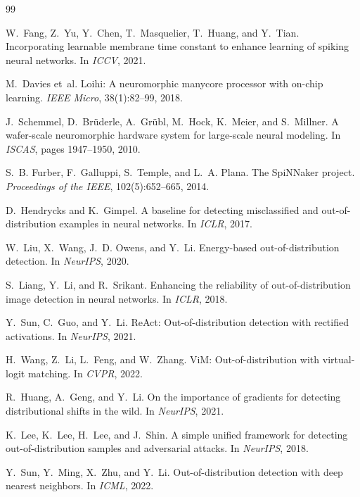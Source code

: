 \ifdefined\theoryhardwareEMBED\else
\begin{thebibliography}{99}

W.~Fang, Z.~Yu, Y.~Chen, T.~Masquelier, T.~Huang, and Y.~Tian.
\newblock Incorporating learnable membrane time constant to enhance learning of
  spiking neural networks.
\newblock In \emph{ICCV}, 2021.

M.~Davies et~al.
\newblock Loihi: A neuromorphic manycore processor with on-chip learning.
\newblock \emph{IEEE Micro}, 38(1):82--99, 2018.

J.~Schemmel, D.~Br\"uderle, A.~Gr\"ubl, M.~Hock, K.~Meier, and S.~Millner.
\newblock A wafer-scale neuromorphic hardware system for large-scale neural
  modeling.
\newblock In \emph{ISCAS}, pages 1947--1950, 2010.

S.~B. Furber, F.~Galluppi, S.~Temple, and L.~A. Plana.
\newblock The SpiNNaker project.
\newblock \emph{Proceedings of the IEEE}, 102(5):652--665, 2014.

D.~Hendrycks and K.~Gimpel.
\newblock A baseline for detecting misclassified and out-of-distribution
  examples in neural networks.
\newblock In \emph{ICLR}, 2017.

W.~Liu, X.~Wang, J.~D. Owens, and Y.~Li.
\newblock Energy-based out-of-distribution detection.
\newblock In \emph{NeurIPS}, 2020.

S.~Liang, Y.~Li, and R.~Srikant.
\newblock Enhancing the reliability of out-of-distribution image detection in
  neural networks.
\newblock In \emph{ICLR}, 2018.

Y.~Sun, C.~Guo, and Y.~Li.
\newblock ReAct: Out-of-distribution detection with rectified activations.
\newblock In \emph{NeurIPS}, 2021.

H.~Wang, Z.~Li, L.~Feng, and W.~Zhang.
\newblock ViM: Out-of-distribution with virtual-logit matching.
\newblock In \emph{CVPR}, 2022.

R.~Huang, A.~Geng, and Y.~Li.
\newblock On the importance of gradients for detecting distributional shifts in
  the wild.
\newblock In \emph{NeurIPS}, 2021.

K.~Lee, K.~Lee, H.~Lee, and J.~Shin.
\newblock A simple unified framework for detecting out-of-distribution samples
  and adversarial attacks.
\newblock In \emph{NeurIPS}, 2018.

Y.~Sun, Y.~Ming, X.~Zhu, and Y.~Li.
\newblock Out-of-distribution detection with deep nearest neighbors.
\newblock In \emph{ICML}, 2022.

\end{thebibliography}

\fi
